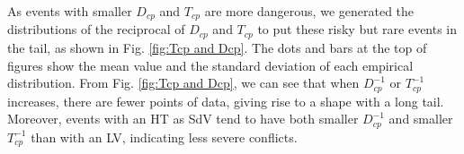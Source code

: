 \documentclass[letterpaper, 10 pt, conference]{ieeeconf}
\begin{document}
 As events with smaller $D_{cp}$ and $T_{cp}$ are more dangerous, we generated the distributions of the reciprocal of $D_{cp}$ and $T_{cp}$  to put these risky but rare events in the tail, as shown in Fig. \ref{fig:Tcp and Dcp}. 
 The dots and bars at the top of figures show the mean value and the standard deviation of each empirical distribution. From Fig. \ref{fig:Tcp and Dcp}, we can see that when $D_{cp}^{-1}$ or $T_{cp}^{-1}$ increases, there are fewer points of data, giving rise to a shape with a long tail. Moreover, events with an HT as SdV tend to have both smaller $D_{cp}^{-1}$ and smaller $T_{cp}^{-1}$ than with an LV, indicating less severe conflicts.


\end{document}
